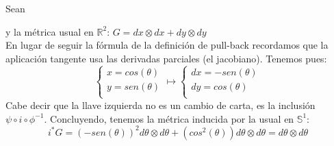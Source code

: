 \documentclass[palatino, bibnumbers]{apuntes}
\begin{document}
\begin{example} Sean 
y la métrica usual en $ℝ^2$: $G=dx\otimes dx+dy\otimes dy$\\
En lugar de seguir la fórmula de la definición de pull-back recordamos que la aplicación tangente usa las derivadas parciales (el jacobiano). Tenemos pues:\\
$$\begin{cases}
x=cos (\theta)\\
y=sen(\theta)\\
\end{cases}\mapsto
\begin{cases}
dx=-sen (\theta)\\
dy=cos(\theta)\\
\end{cases}$$
Cabe decir que la llave izquierda no es un cambio de carta, es la inclusión $\psi\circ i\circ \phi^{-1}$. Concluyendo, tenemos la métrica inducida por la usual en $\mathbb{S}^1$:
$$i^*G=(-sen(\theta))^2d\theta\otimes d\theta + (cos^2(\theta))d\theta\otimes d\theta=d\theta\otimes d\theta$$ 
\end{example}
\end{document}
